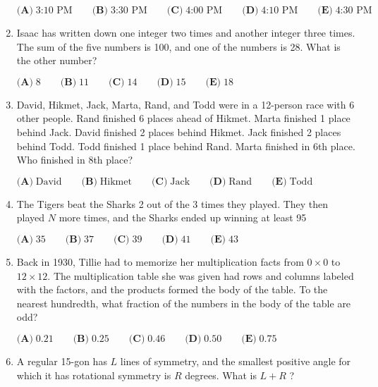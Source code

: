 \documentclass{article}
\begin{document}
\begin{enumerate}[label=\arabic*., itemsep=0.5em]
\(\textbf{(A)}\; \text{3:10 PM} \qquad\textbf{(B)}\; \text{3:30 PM} \qquad\textbf{(C)}\; \text{4:00 PM} \qquad\textbf{(D)}\; \text{4:10 PM} \qquad\textbf{(E)}\; \text{4:30 PM}\)\par \vspace{0.5em}\item Isaac has written down one integer two times and another integer three times. The sum of the five numbers is 100, and one of the numbers is 28. What is the other number?

\(\textbf{(A)}\; 8 \qquad\textbf{(B)}\; 11 \qquad\textbf{(C)}\; 14 \qquad\textbf{(D)}\; 15 \qquad\textbf{(E)}\; 18\)\par \vspace{0.5em}\item David, Hikmet, Jack, Marta, Rand, and Todd were in a 12-person race with 6 other people. Rand finished 6 places ahead of Hikmet. Marta finished 1 place behind Jack. David finished 2 places behind Hikmet. Jack finished 2 places behind Todd. Todd finished 1 place behind Rand. Marta finished in 6th place. Who finished in 8th place?

\(\textbf{(A)}\; \text{David} \qquad\textbf{(B)}\; \text{Hikmet} \qquad\textbf{(C)}\; \text{Jack} \qquad\textbf{(D)}\; \text{Rand} \qquad\textbf{(E)}\; \text{Todd}\)\par \vspace{0.5em}\item The Tigers beat the Sharks 2 out of the 3 times they played. They then played \(N\) more times, and the Sharks ended up winning at least 95%

\(\textbf{(A)}\; 35 \qquad  \textbf{(B)}\; 37 \qquad \textbf{(C)}\; 39 \qquad \textbf{(D)}\; 41 \qquad \textbf{(E)}\; 43\)\par \vspace{0.5em}\item Back in 1930, Tillie had to memorize her multiplication facts from \(0 \times 0\) to \(12 \times 12\). The multiplication table she was given had rows and columns labeled with the factors, and the products formed the body of the table. To the nearest hundredth, what fraction of the numbers in the body of the table are odd?

\(\textbf{(A)}\; 0.21 \qquad\textbf{(B)}\; 0.25 \qquad\textbf{(C)}\; 0.46 \qquad\textbf{(D)}\; 0.50 \qquad\textbf{(E)}\; 0.75\)\par \vspace{0.5em}\item A regular 15-gon has \(L\) lines of symmetry, and the smallest positive angle for which it has rotational symmetry is \(R\) degrees. What is \(L+R\) ?


\end{enumerate}
\end{document}
